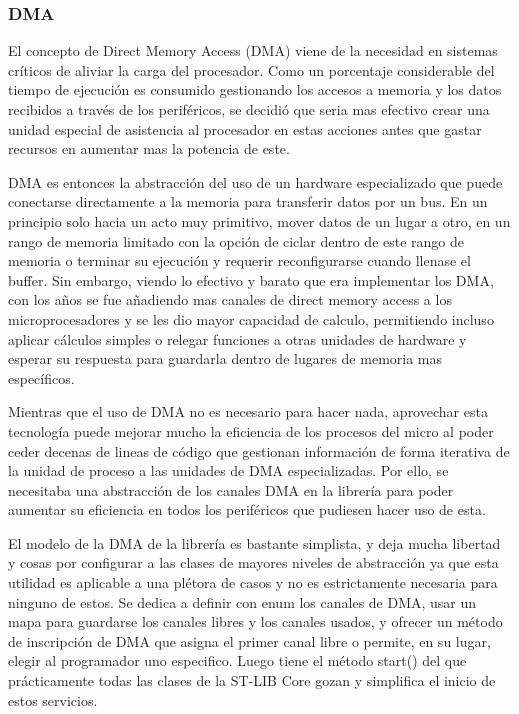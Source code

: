 \documentclass{report}
\begin{document}
\subsubsection{DMA}
El concepto de Direct Memory Access (DMA) viene de la necesidad en sistemas críticos de aliviar la carga del procesador. Como un porcentaje considerable del tiempo de ejecución es consumido gestionando los accesos a memoria y los datos recibidos a través de los periféricos, se decidió que seria mas efectivo crear una unidad especial de asistencia al procesador en estas acciones antes que gastar recursos en aumentar mas la potencia de este. \par \vspace{0.3 cm}
DMA es entonces la abstracción del uso de un hardware especializado que puede conectarse directamente a la memoria para transferir datos por un bus. En un principio solo hacia un acto muy primitivo, mover datos de un lugar a otro, en un rango de memoria limitado con la opción de ciclar dentro de este rango de memoria o terminar su ejecución y requerir reconfigurarse cuando llenase el buffer. Sin embargo, viendo lo efectivo y barato que era implementar los DMA, con los años se fue añadiendo mas canales de direct memory access a los microprocesadores y se les dio mayor capacidad de calculo, permitiendo incluso aplicar cálculos simples o relegar funciones a otras unidades de hardware y esperar su respuesta para guardarla dentro de lugares de memoria mas específicos. 
\par \vspace{0.3 cm}
Mientras que el uso de DMA no es necesario para hacer nada, aprovechar esta tecnología puede mejorar mucho la eficiencia de los procesos del micro al poder ceder decenas de lineas de código que gestionan información de forma iterativa de la unidad de proceso a las unidades de DMA especializadas. Por ello, se necesitaba una abstracción de los canales DMA en la librería para poder aumentar su eficiencia en todos los periféricos que pudiesen hacer uso de esta. \par \vspace{0.3 cm}
El modelo de la DMA de la librería es bastante simplista, y deja mucha libertad y cosas por configurar a las clases de mayores niveles de abstracción ya que esta utilidad es aplicable a una plétora de casos y no es estrictamente necesaria para ninguno de estos. Se dedica a definir con enum los canales de DMA, usar un mapa para guardarse los canales libres y los canales usados, y ofrecer un método de inscripción de DMA que asigna el primer canal libre o permite, en su lugar, elegir al programador uno especifico. Luego tiene el método start() del que prácticamente todas las clases de la ST-LIB Core gozan y simplifica el inicio de estos servicios. 
\end{document}
